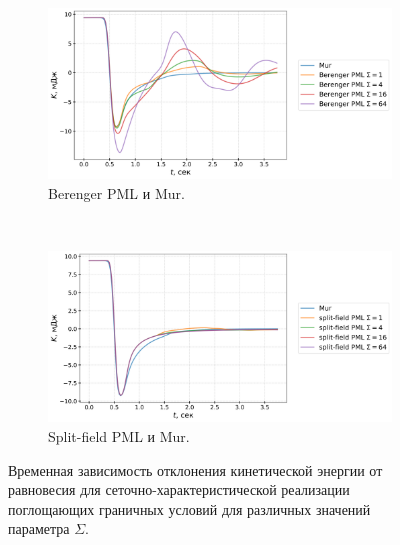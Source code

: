 \begin{figure}[h]
\centering
    \begin{subfigure}{1.0\textwidth}
        \centering
        \includegraphics[width=1.0\textwidth]{images/pml/gcm_Berenger.png}
        \caption{Berenger PML и Mur.}
        \label{fig:gcm_berenger_pml}
    \end{subfigure}
\vspace{0.5cm}\\
    \begin{subfigure}{1.0\textwidth}
        \centering
        \includegraphics[width=1.0\textwidth]{images/pml/gcm_split-field.png}
        \caption{Split-field PML и Mur.}
        \label{fig:gcm_split_field_pml}
    \end{subfigure}
\caption{Временная зависимость отклонения кинетической энергии от равновесия для сеточно-характеристической реализации поглощающих граничных условий для различных значений параметра $\Sigma$.}
\label{fig:gcm_pml}
\end{figure}

